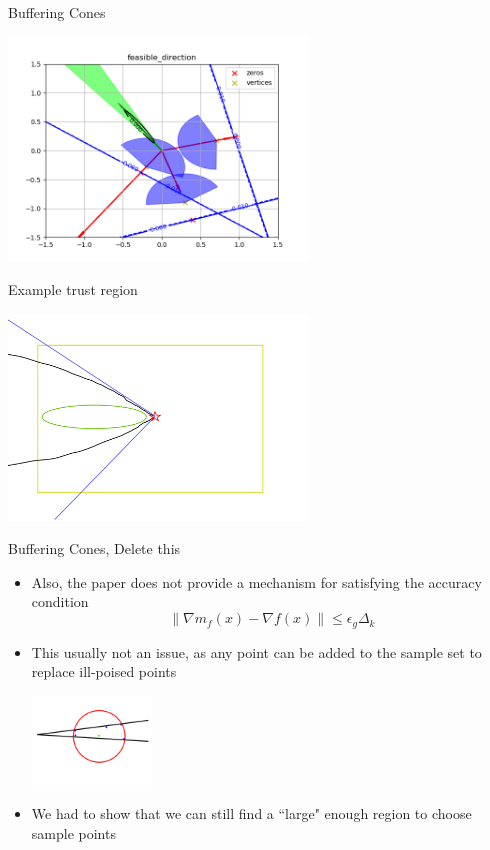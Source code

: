 \documentclass{beamer}
\newcommand{\dk}{{\Delta_k}}
\begin{document}
\begin{frame}{Buffering Cones}
	\begin{center}
		\includegraphics[width=300px]{images/feasible_direction.png}
	\end{center}
\end{frame}



\begin{frame}{Example trust region}
\begin{center}
	\includegraphics[width=300px]{images/trust_regions.png}
\end{center}
\end{frame}


\begin{frame}{Buffering Cones, Delete this}
	\begin{itemize}
		\item Also, the paper does not provide a mechanism for satisfying the accuracy condition
		\[\|\nabla m_f(x) - \nabla f(x)\| \le \epsilon_g \dk \]
		\item This usually not an issue, as any point can be added to the sample set to
		replace ill-poised points
		\begin{center}
			\includegraphics[width=120px]{images/impossible_poised.png}
		\end{center}
		\item We had to show that we can still find a ``large" enough region to choose sample points
	\end{itemize}
\end{frame}
\end{document}

